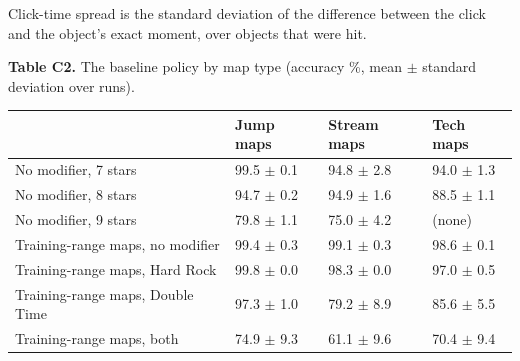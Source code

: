 \documentclass[10pt,a4paper]{article}
\begin{document}
Click-time spread is the standard deviation of the difference between the click and the object's exact moment, over objects that were hit.


\par\medskip\noindent\begin{minipage}{\linewidth}\raggedright {\small \textbf{Table C2.} The baseline policy by map type (accuracy \%, mean $\pm$ standard deviation over runs).\par}\vspace{3pt}\centering \small\setlength{\tabcolsep}{5pt}\renewcommand{\arraystretch}{1.12}\begin{tabular}{llll}\toprule
 & Jump maps & Stream maps & Tech maps \\\midrule
No modifier, 7 stars & 99.5 $\pm$ 0.1 & 94.8 $\pm$ 2.8 & 94.0 $\pm$ 1.3 \\
No modifier, 8 stars & 94.7 $\pm$ 0.2 & 94.9 $\pm$ 1.6 & 88.5 $\pm$ 1.1 \\
No modifier, 9 stars & 79.8 $\pm$ 1.1 & 75.0 $\pm$ 4.2 & (none) \\
Training-range maps, no modifier & 99.4 $\pm$ 0.3 & 99.1 $\pm$ 0.3 & 98.6 $\pm$ 0.1 \\
Training-range maps, Hard Rock & 99.8 $\pm$ 0.0 & 98.3 $\pm$ 0.0 & 97.0 $\pm$ 0.5 \\
Training-range maps, Double Time & 97.3 $\pm$ 1.0 & 79.2 $\pm$ 8.9 & 85.6 $\pm$ 5.5 \\
Training-range maps, both & 74.9 $\pm$ 9.3 & 61.1 $\pm$ 9.6 & 70.4 $\pm$ 9.4 \\\bottomrule\end{tabular}\end{minipage}\par\medskip
\end{document}
